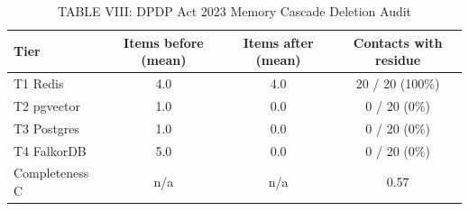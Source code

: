 \begin{table}[t]
\centering
\caption{TABLE VIII: DPDP Act 2023 Memory Cascade Deletion Audit}
\label{tab:erasure_audit}
\begin{tabular}{lccc}
\toprule
Tier & Items before (mean) & Items after (mean) & Contacts with residue \\
\midrule
T1 Redis & 4.0 & 4.0 & 20 / 20 (100\%) \\
T2 pgvector & 1.0 & 0.0 & 0 / 20 (0\%) \\
T3 Postgres & 1.0 & 0.0 & 0 / 20 (0\%) \\
T4 FalkorDB & 5.0 & 0.0 & 0 / 20 (0\%) \\
\midrule
Completeness C & n/a & n/a & 0.57 \\
\bottomrule
\end{tabular}
\end{table}